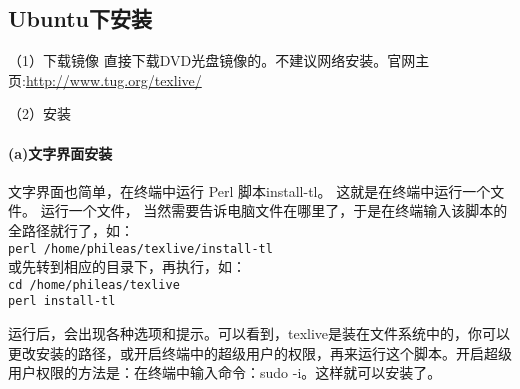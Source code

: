 \subsection{Ubuntu下安装}
（1）下载镜像
直接下载DVD光盘镜像的。不建议网络安装。官网主页:\url{http://www.tug.org/texlive/}


（2）安装
\paragraph{(a)文字界面安装}
文字界面也简单，在终端中运行 Perl 脚本install-tl。 这就是在终端中运行一个文件。 运行一个文件， 当然需要告诉电脑文件在哪里了，于是在终端输入该脚本的全路径就行了，如：\\
\verb*|perl /home/phileas/texlive/install-tl|\\
或先转到相应的目录下，再执行，如：\\
\verb*|cd /home/phileas/texlive|\\
\verb*|perl install-tl|

运行后，会出现各种选项和提示。可以看到，texlive是装在文件系统中的，你可以更改安装的路径，或开启终端中的超级用户的权限，再来运行这个脚本。开启超级用户权限的方法是：在终端中输入命令：sudo -i。这样就可以安装了。

